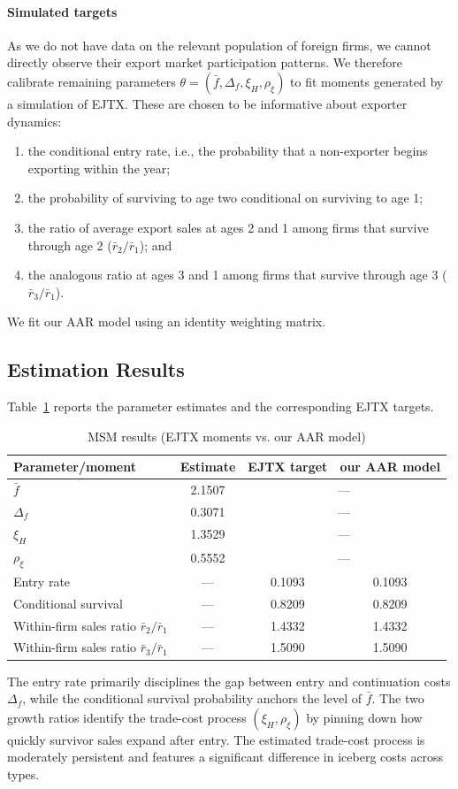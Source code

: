 \documentclass[12pt]{article} \usepackage{amsmath,amssymb,amsthm,geometry,graphicx,setspace,algorithm,algpseudocode,float}
\begin{document}
\paragraph{Simulated targets}
As we do not have data on the relevant population of foreign firms, we cannot directly observe their export market participation patterns. We therefore calibrate remaining parameters $\theta = (\bar f, \Delta_f, \xi_H, \rho_\xi)$ to fit moments generated by a simulation of EJTX. These are chosen to be informative about exporter dynamics: 
\begin{enumerate}
   \item the conditional entry rate, i.e., the probability that a non-exporter begins exporting within the year;
   \item the probability of surviving to age two conditional on surviving to age 1;
   \item the ratio of average export sales at ages 2 and 1 among firms that survive through age 2 ($\bar r_{2}/\bar r_{1}$); and
   \item the analogous ratio at ages 3 and 1 among firms that survive through age 3 ($\bar r_{3}/\bar r_{1}$).
\end{enumerate}
We fit our AAR model using an identity weighting matrix.

\subsection{Estimation Results}
Table~\ref{tab:estimates} reports the parameter estimates and the corresponding EJTX targets. 
\begin{table}[h]
  \centering
  \caption{MSM results (EJTX moments vs. our AAR model)}
  \label{tab:estimates}
  \begin{tabular}{lccc}
    \toprule
    Parameter/moment & Estimate & EJTX target & our AAR model \\ \midrule
    $\bar f$ & 2.1507 & \multicolumn{2}{c}{---} \\
    $\Delta_f$ & 0.3071 & \multicolumn{2}{c}{---} \\
    $\xi_H$ & 1.3529 & \multicolumn{2}{c}{---} \\
    $\rho_\xi$ & 0.5552 & \multicolumn{2}{c}{---} \\
    \midrule
    Entry rate  & --- & 0.1093 & 0.1093 \\
    Conditional survival & --- & 0.8209 & 0.8209 \\
    Within-firm sales ratio $\bar r_{2}/\bar r_{1}$ & --- & 1.4332 & 1.4332 \\
    Within-firm sales ratio $\bar r_{3}/\bar r_{1}$ & --- & 1.5090 & 1.5090 \\
    \bottomrule
  \end{tabular}
\end{table}
The entry rate primarily disciplines the gap between entry and continuation costs $\Delta_f$, while the conditional survival probability anchors the level of $\bar f$. The two growth ratios identify the trade-cost process $(\xi_H,\rho_\xi)$ by pinning down how quickly survivor sales expand after entry. The estimated trade-cost process is moderately persistent and features a significant difference in iceberg costs across types.
 
\end{document}
